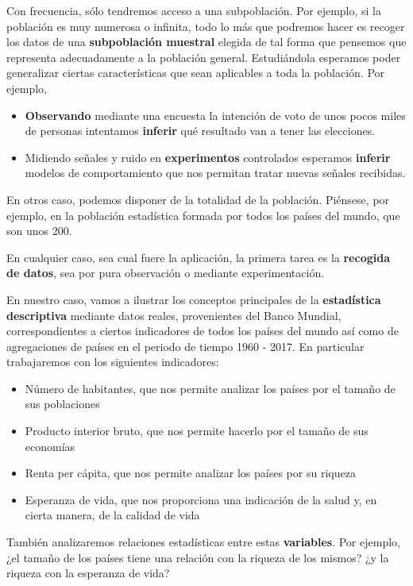 \documentclass[11pt]{article}
\providecommand{\tightlist}{%
      \setlength{\itemsep}{0pt}\setlength{\parskip}{0pt}}
\begin{document}
    Con frecuencia, sólo tendremos acceso a una subpoblación. Por ejemplo,
si la población es muy numerosa o infinita, todo lo más que podremos
hacer es recoger los datos de una \textbf{subpoblación muestral} elegida
de tal forma que pensemos que representa adecuadamente a la población
general. Estudiándola esperamos poder generalizar ciertas
características que sean aplicables a toda la población. Por ejemplo, 
\begin{itemize}
\item
\textbf{Observando} mediante una encuesta la intención de voto de unos
pocos miles de personas intentamos \textbf{inferir} qué resultado van a
tener las elecciones. 
\item 
Midiendo señales y ruido en
\textbf{experimentos} controlados esperamos \textbf{inferir} modelos de
comportamiento que nos permitan tratar nuevas señales recibidas.
\end{itemize}

En otros caso, podemos disponer de la totalidad de la población.
Piénsese, por ejemplo, en la población estadística formada por todos los
países del mundo, que son unos 200.

En cualquier caso, sea cual fuere la aplicación, la primera tarea es la
\textbf{recogida de datos}, sea por pura observación o mediante
experimentación.

    En nuestro caso, vamos a ilustrar los conceptos principales de la
\textbf{estadística descriptiva} mediante datos reales, provenientes del
Banco Mundial, correspondientes a ciertos indicadores de todos los
países del mundo así como de agregaciones de países en el periodo de
tiempo 1960 - 2017. En particular trabajaremos con los siguientes
indicadores:

\begin{itemize}
\tightlist
\item
  Número de habitantes, que nos permite analizar los países por el
  tamaño de sus poblaciones
\item
  Producto interior bruto, que nos permite hacerlo por el tamaño de sus
  economías
\item
  Renta per cápita, que nos permite analizar los países por su riqueza
\item
  Esperanza de vida, que nos proporciona una indicación de la salud y,
  en cierta manera, de la calidad de vida
\end{itemize}

También analizaremos relaciones estadísticas entre estas
\textbf{variables}. Por ejemplo, ¿el tamaño de los países tiene una
relación con la riqueza de los mismos? ¿y la riqueza con la esperanza de
vida?
\end{document}
